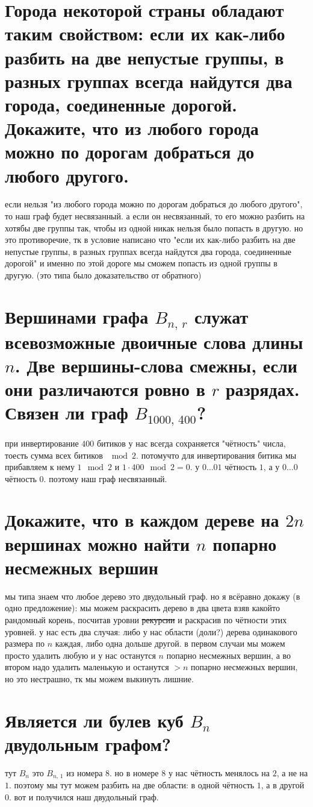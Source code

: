 \documentclass{article}
\begin{document}
  \section{Города некоторой страны обладают таким свойством: если их как-либо разбить на две непустые группы, в разных группах всегда найдутся два города, соединенные дорогой. Докажите, что из любого города можно по дорогам добраться до любого другого.}
  если нельзя "{}из любого города можно по дорогам добраться до любого другого"{}, то наш граф будет несвязанный.
  а если он несвязанный, то его можно разбить на хотябы две группы так, чтобы из одной никак нельзя было попасть в другую.
  но это противоречие, тк в условие написано что
  "{}если их как-либо разбить на две непустые группы, в разных группах всегда найдутся два города, соединенные дорогой"{}
  и именно по этой дороге мы сможем попасть из одной группы в другую.
  (это типа было доказательство от обратного)

  \section{Вершинами графа $B_{n,\, r}$ служат всевозможные двоичные слова длины $n$. Две вершины-слова смежны, если они различаются ровно в $r$ разрядах. Связен ли граф $B_{1000,\, 400}$?}
  при инвертирование $400$ битиков у нас всегда сохраняется "{}чётность"{} числа, тоесть сумма всех битиков $\mod 2$.
  потомучто для инвертирования битика мы прибавляем к нему $1 \mod 2$ и $1 \cdot 400 \mod 2 = 0$.
  у $0 \dots 01$ чётность $1$, а у $0 \dots 0$ чётность $0$.
  поэтому наш граф несвязанный.

  \section{Докажите, что в каждом дереве на $2n$ вершинах можно найти $n$ попарно несмежных вершин}
  мы типа знаем что любое дерево это двудольный граф.
  но я всёравно докажу (в одно предложение): мы можем раскрасить дерево в два цвета взяв какойто рандомный корень,
  посчитав уровни \st{рекурсии} и раскрасив по чётности этих уровней.
  у нас есть два случая: либо у нас области (доли?) дерева одинакового размера по $n$ каждая, либо одна дольше другой.
  в первом случаи мы можем просто удалить любую и у нас останутся $n$ попарно несмежных вершин,
  а во втором надо удалить маленькую и останутся $>n$ попарно несмежных вершин, но это нестрашно, тк мы можем выкинуть лишние.

  \section{Является ли булев куб $B_n$ двудольным графом?}
  тут $B_n$ это $B_{n,\, 1}$ из номера 8.
  но в номере 8 у нас чётность менялось на $2$, а не на $1$.
  поэтому мы тут можем разбить на две области: в одной чётность $1$, а в другой $0$.
  вот и получился наш двудольный граф.
\end{document}
